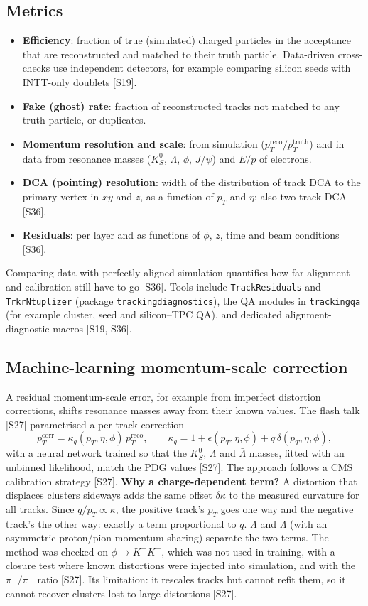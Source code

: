 \documentclass[11pt,letterpaper]{article}
\begin{document}
\subsection{Metrics}
\begin{itemize}
\item \textbf{Efficiency}: fraction of true (simulated) charged particles in the acceptance that are reconstructed and matched to their truth particle.
Data-driven cross-checks use independent detectors, for example comparing silicon seeds with INTT-only doublets [S19].
\item \textbf{Fake (ghost) rate}: fraction of reconstructed tracks not matched to any truth particle, or duplicates.
\item \textbf{Momentum resolution and scale}: from simulation ($p_T^{\mathrm{reco}}/p_T^{\mathrm{truth}}$) and in data from resonance masses ($K^0_S$, $\Lambda$, $\phi$, $J/\psi$) and $E/p$ of electrons.
\item \textbf{DCA (pointing) resolution}: width of the distribution of track DCA to the primary vertex in $xy$ and $z$, as a function of $p_T$ and $\eta$; also two-track DCA [S36].
\item \textbf{Residuals}: per layer and as functions of $\phi$, $z$, time and beam conditions [S36].
\end{itemize}
Comparing data with perfectly aligned simulation quantifies how far alignment and calibration still have to go [S36].
Tools include \texttt{TrackResiduals} and \texttt{TrkrNtuplizer} (package \texttt{trackingdiagnostics}), the QA modules in \texttt{trackingqa} (for example cluster, seed and silicon--TPC QA), and dedicated alignment-diagnostic macros [S19, S36].

\subsection{Machine-learning momentum-scale correction}
A residual momentum-scale error, for example from imperfect distortion corrections, shifts resonance masses away from their known values. The flash talk [S27] parametrised a per-track correction
\begin{equation}
p_T^{\mathrm{corr}} = \kappa_q(p_T,\eta,\phi)\,p_T^{\mathrm{reco}},\qquad \kappa_q = 1+\epsilon(p_T,\eta,\phi)+q\,\delta(p_T,\eta,\phi),
\end{equation}
with a neural network trained so that the $K^0_S$, $\Lambda$ and $\bar\Lambda$ masses, fitted with an unbinned likelihood, match the PDG values [S27]. The approach follows a CMS calibration strategy [S27].
\textbf{Why a charge-dependent term?} A distortion that displaces clusters sideways adds the same offset $\delta\kappa$ to the measured curvature for all tracks. Since $q/p_T\propto\kappa$,
the positive track's $p_T$ goes one way and the negative track's the other way: exactly a term proportional to $q$. $\Lambda$ and $\bar\Lambda$ (with an asymmetric proton/pion momentum sharing) separate the two terms.
The method was checked on $\phi\to K^+K^-$, which was not used in training, with a closure test where known distortions were injected into simulation, and with the $\pi^-/\pi^+$ ratio [S27].
Its limitation: it rescales tracks but cannot refit them, so it cannot recover clusters lost to large distortions [S27].
\end{document}
